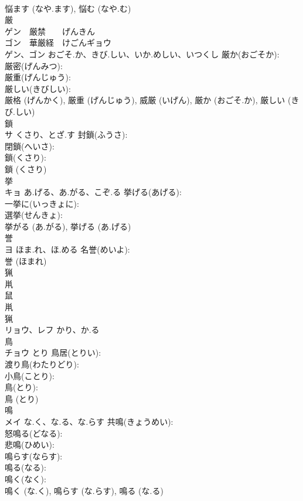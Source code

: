 \documentclass[8pt]{extreport}
\begin{document}
\begin{CJK}{UTF8}{min}
\\	悩ます (なや.ます), 悩む (なや.む)
\\	厳			
\\	ゲン　厳禁　　げんきん　
\\	ゴン　華厳経　けごんギョウ
\\	ゲン、ゴン	おごそ.か、きび.しい、いか.めしい、いつくし	厳か(おごそか): 
\\	厳密(げんみつ): 
\\	厳重(げんじゅう): 
\\	厳しい(きびしい): 
\\	厳格 (げんかく), 厳重 (げんじゅう), 威厳 (いげん), 厳か (おごそ.か), 厳しい (きび.しい)
\\	鎖			
\\	サ	くさり、とざ.す	封鎖(ふうさ): 
\\	閉鎖(へいさ): 
\\	鎖(くさり): 
\\	鎖 (くさり)
\\	挙			
\\	キョ	あ.げる、あ.がる、こぞ.る	挙げる(あげる): 
\\	一挙に(いっきょに): 
\\	選挙(せんきょ): 
\\	挙がる (あ.がる), 挙げる (あ.げる)
\\	誉			
\\	ヨ	ほま.れ、ほ.める	名誉(めいよ): 
\\	誉 (ほまれ)
\\	猟			
\\	鼡 
\\	鼠 
\\	鼡 
\\	猟 
\\	リョウ、レフ	かり、か.る		
\\	鳥			
\\	チョウ	とり	鳥居(とりい): 
\\	渡り鳥(わたりどり): 
\\	小鳥(ことり): 
\\	鳥(とり): 
\\	鳥 (とり)
\\	鳴			
\\	メイ	な.く、な.る、な.らす	共鳴(きょうめい): 
\\	怒鳴る(どなる): 
\\	悲鳴(ひめい): 
\\	鳴らす(ならす): 
\\	鳴る(なる): 
\\	鳴く(なく): 
\\	鳴く (な.く), 鳴らす (な.らす), 鳴る (な.る)

\end{CJK}
\end{document}
